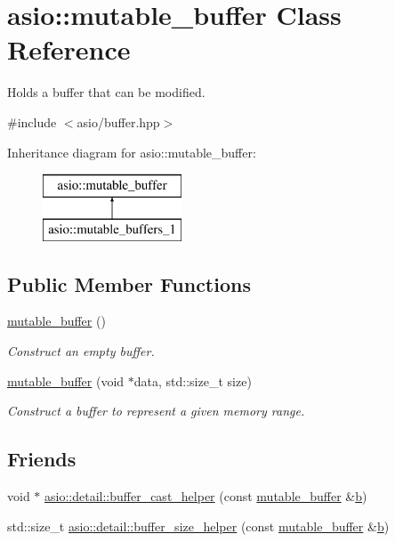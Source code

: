 \hypertarget{classasio_1_1mutable__buffer}{}\section{asio\+:\+:mutable\+\_\+buffer Class Reference}
\label{classasio_1_1mutable__buffer}


Holds a buffer that can be modified.  




{\ttfamily \#include $<$asio/buffer.\+hpp$>$}

Inheritance diagram for asio\+:\+:mutable\+\_\+buffer\+:\begin{figure}[H]
\begin{center}
\leavevmode
\includegraphics[height=2.000000cm]{classasio_1_1mutable__buffer}
\end{center}
\end{figure}
\subsection*{Public Member Functions}
\begin{DoxyCompactItemize}
\item 
\hyperlink{classasio_1_1mutable__buffer_aee716832cf56a039b5aeb057aeb8bfec}{mutable\+\_\+buffer} ()
\begin{DoxyCompactList}\small\item\em Construct an empty buffer. \end{DoxyCompactList}\item 
\hyperlink{classasio_1_1mutable__buffer_ac2102b19275bd6af5bd22eef5599de5b}{mutable\+\_\+buffer} (void $\ast$data, std\+::size\+\_\+t size)
\begin{DoxyCompactList}\small\item\em Construct a buffer to represent a given memory range. \end{DoxyCompactList}\end{DoxyCompactItemize}
\subsection*{Friends}
\begin{DoxyCompactItemize}
\item 
void $\ast$ \hyperlink{classasio_1_1mutable__buffer_a8ef94376754bcdbb4e9ec8a372b3e26e}{asio\+::detail\+::buffer\+\_\+cast\+\_\+helper} (const \hyperlink{classasio_1_1mutable__buffer}{mutable\+\_\+buffer} \&\hyperlink{group__async__read_ga945a5c18fa77a9e2eba420f8f44b2a4f}{b})
\item 
std\+::size\+\_\+t \hyperlink{classasio_1_1mutable__buffer_adf2d9d6967b90d825474bea8fcc2acd4}{asio\+::detail\+::buffer\+\_\+size\+\_\+helper} (const \hyperlink{classasio_1_1mutable__buffer}{mutable\+\_\+buffer} \&\hyperlink{group__async__read_ga945a5c18fa77a9e2eba420f8f44b2a4f}{b})
\end{DoxyCompactItemize}
